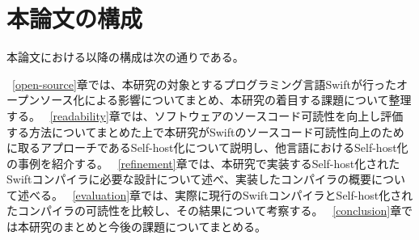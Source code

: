 \section{本論文の構成}

本論文における以降の構成は次の通りである。

~\ref{open-source}章では、本研究の対象とするプログラミング言語Swiftが行ったオープンソース化による影響についてまとめ、本研究の着目する課題について整理する。
~\ref{readability}章では、ソフトウェアのソースコード可読性を向上し評価する方法についてまとめた上で本研究がSwiftのソースコード可読性向上のために取るアプローチであるSelf-host化について説明し、他言語におけるSelf-host化の事例を紹介する。
~\ref{refinement}章では、本研究で実装するSelf-host化されたSwiftコンパイラに必要な設計について述べ、実装したコンパイラの概要について述べる。
~\ref{evaluation}章では、実際に現行のSwiftコンパイラとSelf-host化されたコンパイラの可読性を比較し、その結果について考察する。
~\ref{conclusion}章では本研究のまとめと今後の課題についてまとめる。

